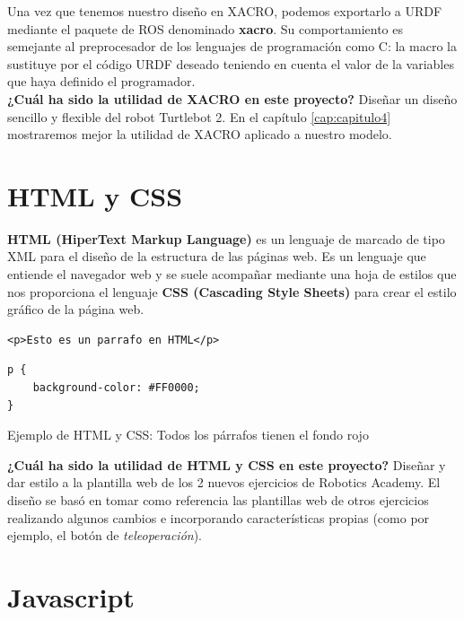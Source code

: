Una vez que tenemos nuestro diseño en XACRO, podemos exportarlo a URDF mediante el paquete de ROS denominado \textbf{xacro}. Su comportamiento es semejante al preprocesador de los lenguajes de programación como C: la macro la sustituye por el código URDF deseado teniendo en cuenta el valor de la variables que haya definido el programador.\\

\textbf{¿Cuál ha sido la utilidad de XACRO en este proyecto?} Diseñar un diseño sencillo y flexible del robot Turtlebot 2. En el capítulo \ref{cap:capitulo4} mostraremos mejor la utilidad de XACRO aplicado a nuestro modelo.\\




\section{HTML y CSS}
\label{sec:html_css}

\textbf{HTML (HiperText Markup Language)} es un lenguaje de marcado de tipo XML para el diseño de la estructura de las páginas web. Es un lenguaje que entiende el navegador web y se suele acompañar mediante una hoja de estilos que nos proporciona el lenguaje \textbf{CSS (Cascading Style Sheets)} para crear el estilo gráfico de la página web.\\


\begin{code}[H]
\begin{lstlisting}
<p>Esto es un parrafo en HTML</p>
\end{lstlisting}
\begin{lstlisting}
p {
	background-color: #FF0000;
}
\end{lstlisting}
\caption[Ejemplo de HTML y CSS]{Ejemplo de HTML y CSS: Todos los párrafos tienen el fondo rojo}
\label{cod:codigo_urdf}
\end{code}

\textbf{¿Cuál ha sido la utilidad de HTML y CSS en este proyecto?} Diseñar y dar estilo a la plantilla web de los 2 nuevos ejercicios de Robotics Academy. El diseño se basó en tomar como referencia las plantillas web de otros ejercicios realizando algunos cambios e incorporando características propias (como por ejemplo, el botón de \textit{teleoperación}).\\




\section{Javascript}
\label{sec:javascript}

